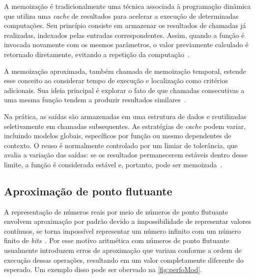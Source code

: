 A memoização é tradicionalmente uma técnica associada à programação dinâmica que utiliza uma \textit{cache} de resultados para acelerar a execução de determinadas computações. Seu princípio consiste em armazenar os resultados de chamadas já realizadas, indexados pelas entradas correspondentes. Assim, quando a função é invocada novamente com os mesmos parâmetros, o valor previamente calculado é retornado diretamente, evitando a repetição da computação~\cite{michie1968}.

A memoização aproximada, também chamada de memoização temporal, estende esse conceito ao considerar tempo de execução e localização como critérios adicionais. Sua ideia principal é explorar o fato de que chamadas consecutivas a uma mesma função tendem a produzir resultados similares~\cite{tziantzioulis2018}.

Na prática, as saídas são armazenadas em uma estrutura de dados e reutilizadas seletivamente em chamadas subsequentes. As estratégias de \textit{cache} podem variar, incluindo modelos globais, específicos por função ou mesmo dependentes de contexto. O reuso é normalmente controlado por um limiar de tolerância, que avalia a variação das saídas: se os resultados permanecerem estáveis dentro desse limite, a função é considerada estável e, portanto, pode ser memoizada~\cite{tziantzioulis2018}.

\subsection{Aproximação de ponto flutuante}\label{subsec:pontoFlut}

A representação de números reais por meio de números de ponto flutuante envolvem aproximação por padrão devido a impossibilidade de representar valores contínuos, se torna impossível representar um número infinito com um número finito de \textit{bits}~\cite{monniaux2008}. Por esse motivo aritmética com números de ponto flutuante usualmente introduzem erros de aproximação que variam conforme a ordem de execução dessas operações, resultando em um valor completamente diferente do esperado. Um exemplo disso pode ser obervado na \autoref{fig:perfoMod}.

